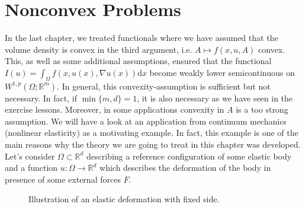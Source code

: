 \chapter{Nonconvex Problems}
In the last chapter, we treated functionals where we have assumed that the volume density is convex in the third argument, i.e. $A\longmapsto f(x,u,A)$ convex. This, as well as some additional assumptions, ensured that the functional $I(u)=\int_\Omega{f(x,u(x),\nabla u(x))\mathrm{d}x}$ become weakly lower semicontinuous on $W^{1,p}(\Omega;\mathbb{R}^m)$. In general, this convexity-assumption is sufficient but not necessary. In fact, if $\min\{m,d\}=1$, it is also necessary as we have seen in the exercise lessons. Moreover, in some applications convexity in $A$ is a too strong assumption. We will have a look at an application from continuum mechanics (nonlinear elasticity) as a motivating example. In fact, this example is one of the main reasons why the theory we are going to treat in this chapter was developed.\\

Let's consider $\Omega\subset\mathbb{R}^d$ describing a reference configuration of some elastic body and a function $u:\Omega\longrightarrow\mathbb{R}^d$ which describes the deformation of the body in presence of some external forces $F$.

\begin{figure}[ht]
	\centering
	\caption{Illustration of an elastic deformation with fixed side.}
\end{figure}

